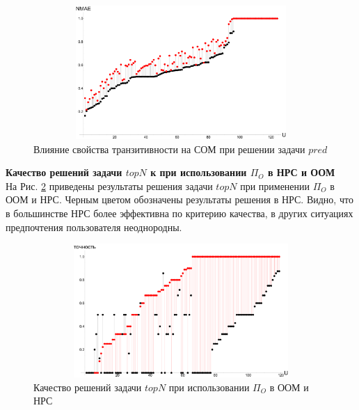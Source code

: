 \begin{figure}[H]
	\caption{Влияние свойства транзитивности на СОМ при решении задачи $pred$}
	\label{pic:pred_trans}
	\begin{center}
		\includegraphics[width=5in,height=2in]{pics/results/ub_transitivity.pdf}
\end{center}
\end{figure}


{\bf Качество решений задачи $topN$ к при использовании $\Pi_O$ в НРС и ООМ}\\
На Рис. \ref{pic:topn_pio} приведены результаты решения
задачи $topN$ при применении $\Pi_O$ в ООМ и НРС.
Черным цветом обозначены результаты решения в НРС.
Видно, что в большинстве НРС более эффективна по критерию качества,
в других ситуациях предпочтения пользователя неоднородны.

\begin{figure}[H]
	\caption{Качество решений задачи $topN$ при использовании $\Pi_O$ в ООМ и
	НРС}
	\label{pic:topn_pio}
	\begin{center}
		\includegraphics[width=5in,height=2in]{pics/results/ib_method_in_ib_and_fuzzy_model.pdf}
\end{center}
\end{figure}

